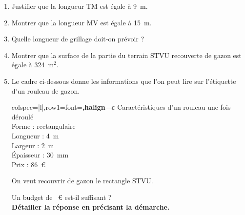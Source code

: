 \documentclass[exercice,a4]{thedocument}%
\begin{document}
\begin{enumerate}
	\item Justifier que la longueur TM est égale à 9~m.
	\item Montrer que la longueur MV est égale à 15~m.
	\item Quelle longueur de grillage doit-on prévoir ?
	\item Montrer que la surface de la partie du terrain STVU recouverte de gazon est égale à 324~m$^2$.
	\item Le cadre ci-dessous donne les informations que l'on peut lire sur l'étiquette d'un rouleau de gazon.

	\begin{center}
	\begin{tblr}{colspec={|l|},row{1}={font=\bfseries,halign=c}}
		\hline
		Caractéristiques d'un rouleau une fois déroulé \\
		Forme : rectangulaire \\
		Longueur : 4~m \\
		Largeur : 2~m \\
		Épaisseur : 30~mm \\
		Prix : 86~\euro \\ \hline
	\end{tblr}
	\end{center}

	On veut recouvrir de gazon le rectangle STVU.

	Un budget de ~\euro{} est-il suffisant ?\\
	\textbf{Détailler la réponse en précisant la démarche.}
\end{enumerate}

\medskip
\showthesource
\end{document}
